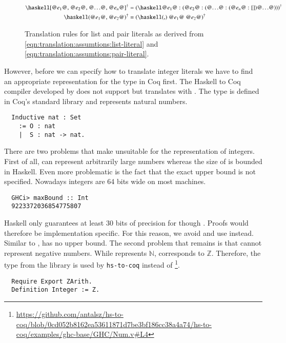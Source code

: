 \begin{figure}[H]
  \begin{align*}
    \toCoq{\haskellM{[@$e_1$@, @$e_2$@, @$\ldots$@, @$e_n$@]}}
    &= \toCoq{(\haskellM{@$e_1$@ : (@$e_2$@ : (@$\ldots$@ : (@$e_n$@ : [])@$\ldots$@))})}
    \\
    \toCoq{\haskellM{(@$e_1$@, @$e_2$@)}}
    &= \toCoq{(\haskellM{(,) @$e_1$@ @$e_2$@})}
  \end{align*}
  \caption{Translation rules for list and pair literals as derived from \autoref{eqn:translation:assumtions:list-literal} and \autoref{eqn:translation:assumtions:pair-literal}.}
  \label{fig:translation:expr:literals:list-and-pair}
\end{figure}

However, before we can specify how to translate integer literals we have to find an appropriate representation for the type  in Coq first.
The Haskell to Coq compiler developed by \cite{Jessen:2019} does not support  but translates  with .
The type  is defined in Coq's standard library and represents natural numbers.
\begin{verbatim}
  Inductive nat : Set
    := O : nat
    |  S : nat -> nat.
\end{verbatim}
There are two problems that make  unsuitable for the representation of integers. First of all,  can represent arbitrarily large numbers whereas the size of  is bounded in Haskell.
Even more problematic is the fact that the exact upper bound is not specified.
Nowadays integers are 64 bits wide on most machines.
\begin{verbatim}
  GHCi> maxBound :: Int
  9223372036854775807
\end{verbatim}
Haskell only guarantees at least 30 bits of precision for  though \cite[p.~181]{Marlow:2010}.
Proofs would therefore be implementation specific.
For this reason, we avoid  and use  instead.
Similar to ,  has no upper bound.
The second problem that remains is that  cannot represent negative numbers.
While  represents $\mathbb{N}$,  corresponds to $\mathbb{Z}$.
Therefore, the type  from the  library is used by \texttt{hs-to-coq} instead of  \footnote{\url{https://github.com/antalsz/hs-to-coq/blob/0cd052b8162ea53611871d7be3bf186cc38a4a74/hs-to-coq/examples/ghc-base/GHC/Num.v\#L4}}.
\begin{verbatim}
  Require Export ZArith.
  Definition Integer := Z.
\end{verbatim}
